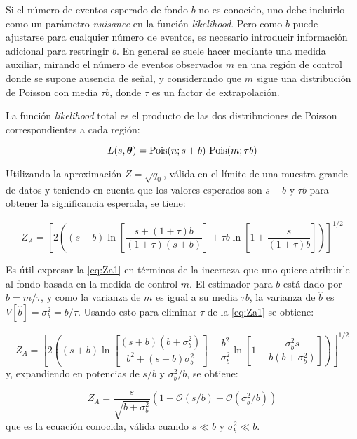 Si el número de eventos esperado de fondo $b$ no es conocido, uno debe incluirlo
como un parámetro \emph{nuisance} en la función \emph{likelihood}. Pero como $b$ puede
ajustarse para cualquier número de eventos, es necesario introducir información
adicional para restringir $b$. En general se suele hacer mediante una medida
auxiliar, mirando el número de eventos observados $m$ en una región de control
donde se supone ausencia de señal, y considerando que $m$ sigue
una distribución de Poisson con media $\tau b$, donde $\tau$ es un factor de
extrapolación.

La función \emph{likelihood} total es el producto de las dos distribuciones de Poisson
correspondientes a cada región:

\begin{equation}
  L(s, \bm{\theta}) = \operatorname{Pois} (n;s+b) \, \operatorname{Pois}(m;\tau b)
\end{equation}

Utilizando la aproximación $Z = \sqrt{q_0}$, válida en el límite de una muestra
grande de datos y teniendo en cuenta que los valores esperados son $s+b$ y $\tau b$
para obtener la significancia esperada, se tiene:

\begin{equation}
  Z_A = \left[ 2 \left( (s+b) \ln \left[ \frac{s+(1+\tau)b}{(1+\tau)(s+b)}
      \right] + \tau b \ln \left[ 1 + \frac{s}{(1+\tau)b} \right] \right)
    \right]^{1/2}
  \label{eq:Za1}
\end{equation}

Es útil expresar la \cref{eq:Za1} en términos de la incerteza que uno
quiere atribuirle al fondo basada en la medida de control $m$. El estimador
para $b$ está dado por $\hat{b} = m/\tau$, y como la varianza de $m$ es igual a
su media $\tau b$, la varianza de $\hat{b}$ es $V[\hat{b}] = \sigma_b^2 =
b/\tau$. Usando esto para eliminar $\tau$ de la \cref{eq:Za1}
se obtiene:

\begin{equation}
  Z_A = \left[ 2 \left( (s+b) \ln \left[
      \frac{(s+b)(b+\sigma_b^2)}{b^2+(s+b)\sigma_b^2} \right] -
    \frac{b^2}{\sigma_b^2} \ln \left[ 1 + \frac{\sigma_b^2 s}{b(b+\sigma_b^2)}
      \right] \right) \right]^{1/2}
  \label{eq:Za}
\end{equation}
%
y, expandiendo en potencias de $s/b$ y $\sigma_b^2/b$, se obtiene:

\begin{equation}
  Z_A = \frac{s}{\sqrt{b+\sigma_b^2}} \left( 1 + \mathcal{O}(s/b) + \mathcal{O}(\sigma_b^2/b) \right)
\end{equation}
%
que es la ecuación conocida, válida cuando $s\ll b$ y $\sigma_b^2 \ll b$.
